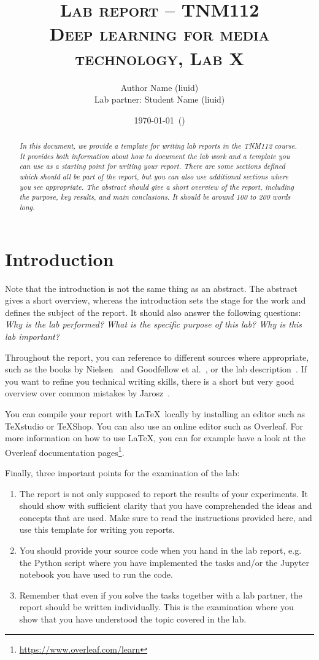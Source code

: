 \documentclass[a4paper]{article}
\title{
	\baselineskip 12pt
	\textsc{
		Lab report -- TNM112\\
		\small{Deep learning for media technology, Lab X}
	}
}
\author{Author Name (liuid)\\
\small{Lab partner: Student Name (liuid)}}
\date{\small\today\ (\currenttime)}
\begin{document}
\maketitle

\begin{abstract}
\noindent
\emph{
	In this document, we provide a template for writing lab reports in the TNM112 course. It provides both information about how to document the lab work and a template you can use as a starting point for writing your report. There are some sections defined which should all be part of the report, but you can also use additional sections where you see appropriate. The abstract should give a short overview of the report, including the purpose, key results, and main conclusions. It should be around 100 to 200 words long. 
}
\end{abstract}

\section{Introduction}
Note that the introduction is not the same thing as an abstract. The abstract gives a short overview, whereas the introduction sets the stage for the work and defines the subject of the report. It should also answer the following questions: \emph{Why is the lab performed? What is the specific purpose of this lab? Why is this lab important?}

Throughout the report, you can reference to different sources where appropriate, such as the books by Nielsen~\cite{nielsen2015} and Goodfellow et al.~\cite{goodfellow2016}, or the lab description~\cite{lab01}. If you want to refine you technical writing skills, there is a short but very good overview over common mistakes by Jarosz~\cite{jarosz2021}.

You can compile your report with \LaTeX\ locally by installing an editor such as TeXstudio or TeXShop. You can also use an online editor such as Overleaf. For more information on how to use \LaTeX, you can for example have a look at the Overleaf documentation pages\footnote{\url{https://www.overleaf.com/learn}}.

\vspace{0.3cm}
\noindent Finally, three important points for the examination of the lab:
\vspace{-0.1cm}
\begin{enumerate}
	\item The report is not only supposed to report the results of your experiments. It should show with sufficient clarity that you have comprehended the ideas and concepts that are used. Make sure to read the instructions provided here, and use this template for writing you reports.
	\item You should provide your source code when you hand in the lab report, e.g. the Python script where you have implemented the tasks and/or the Jupyter notebook you have used to run the code.
	\item Remember that even if you solve the tasks together with a lab partner, the report should be written individually. This is the examination where you show that you have understood the topic covered in the lab.
\end{enumerate}
\end{document}
